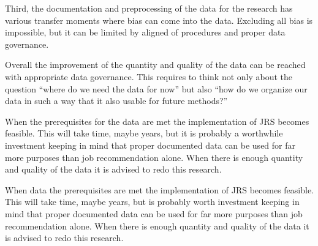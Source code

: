 Third, the documentation and preprocessing of the data for the research has various transfer moments where bias can come into the data. 
Excluding all bias is impossible, but it can be limited by aligned of procedures and proper data governance.

Overall the improvement of the quantity and quality of the data can be reached with appropriate data governance. 
This requires to think not only about the question “where do we need the data for now” but also “how do we organize our data in such a way that it also usable for future methods?”

When the prerequisites for the data are met the implementation of JRS becomes feasible.
This will take time, maybe years, but it is probably a worthwhile  investment keeping in mind that proper documented data can be used for far more purposes than job recommendation alone.
When there is enough quantity and quality of the data it is advised to redo this research. 


When data the prerequisites are met the implementation of JRS becomes feasible.
This will take time, maybe years, but is probably worth investment keeping in mind that proper documented data can be used for far more purposes than job recommendation alone.
When there is enough quantity and quality of the data it is advised to redo this research. 


